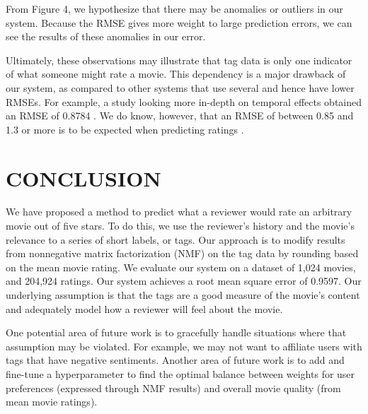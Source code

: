 \documentclass[letterpaper, 10 pt, conference]{ieeeconf}  %
\begin{document}
From Figure 4, we hypothesize that there may be anomalies or outliers in our system. Because the RMSE gives more weight to large prediction errors, we can see the results of these anomalies in our error.

Ultimately, these observations may illustrate that tag data is only one indicator of what someone might rate a movie. This dependency is a major drawback of our system, as compared to other systems that use several and hence have lower RMSEs. For example, a study looking more in-depth on temporal effects obtained an RMSE of 0.8784 \cite{netflix}. We do know, however, that an RMSE of between 0.85 and 1.3 or more is to be expected when predicting ratings \cite{netflix}.

\medbreak
\section{CONCLUSION}

We have proposed a method to predict what a reviewer would rate an arbitrary movie out of five stars. To do this, we use the reviewer's history and the movie's relevance to a series of short labels, or tags.
Our approach is to modify results from nonnegative matrix factorization (NMF) on the tag data by rounding based on the mean movie rating. We evaluate our system on a dataset of 1,024 movies, and 204,924 ratings.
Our system achieves a root mean square error of 0.9597.
Our underlying assumption is that the tags are a good measure of the movie's content and adequately model how a reviewer will feel about the movie.

One potential area of future work is to gracefully handle situations where that assumption may be violated. For example, we may not want to affiliate users with tags that have negative sentiments. Another area of future work is to add and fine-tune a hyperparameter to find the optimal balance between weights for user preferences (expressed through NMF results) and overall movie quality (from mean movie ratings).




\end{document}

